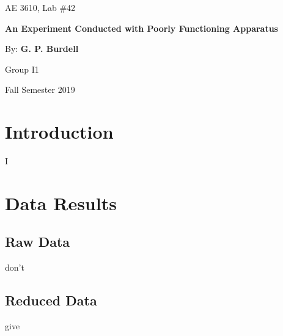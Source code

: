 \documentclass[12pt]{article} %
\begin{document}
\selectfont %

\begin{titlepage}
    \begin{center}
        \large

        \vspace*{1.5in}
        AE 3610, Lab \#42

        \vspace{1.5in}
        \textbf{An Experiment Conducted with Poorly Functioning Apparatus}

        \vspace{0.5in}
        By: \textbf{G. P. Burdell}

        \vspace{2in}
        Group I1

        \vspace{0.5in}
        Fall Semester 2019
    \end{center}
\end{titlepage}
\section*{Introduction}
I
\section*{Data Results}
\subsection*{Raw Data}
don't
\subsection*{Reduced Data}
give
\end{document}
